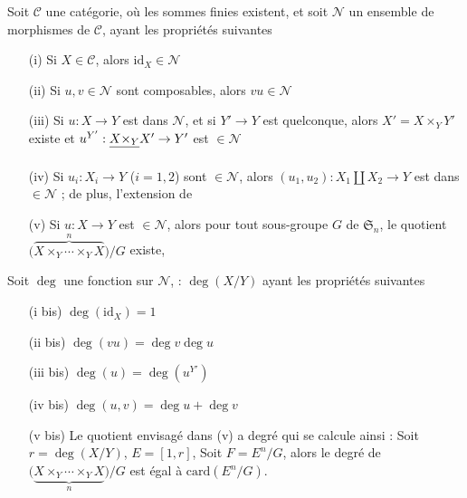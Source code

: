 \documentclass[11pt,a4paper]{article}
\begin{document}
Soit $\mathcal{C}$ une catégorie, où les sommes finies existent, et
soit $\mathcal{N}$ un ensemble de \struck{\ill{}} morphismes de
$\mathcal{C}$, ayant les propriétés suivantes
\begin{enumerate}
  \item[(i)] Si $X \in \mathcal{C}$, alors $\mathrm{id}_X \in \mathcal{N}$
  \item[(ii)] Si $u, v \in \mathcal{N}$ sont composables, alors $vu \in \mathcal{N}$
  \item[(iii)] Si $u : X \to Y$ est dans $\mathcal{N}$, et si $Y' \to Y$ est
  quelconque, alors $X' = X \times_Y Y'$ existe et
  $u^{Y'} : \struck{X \times_Y} X' \to Y'$ est $\in \mathcal{N}$
  \item[(iv)] Si $u_i : X_i \to Y$ ($i = 1, 2$) sont $\in \mathcal{N}$, alors
  $(u_1, u_2) : X_1 \amalg X_2 \to Y$ est dans $\in \mathcal{N}$ ; de plus,
  l'extension de \ill{}
  \item[(v)] Si $u : X \to Y$ est $\in \mathcal{N}$, alors pour tout
  sous-groupe $G$ de $\mathfrak{S}_n$, le quotient
  $\bigl(\overbrace{X \times_Y \cdots \times_Y X}^{n}\bigr)/G$ existe,

   \ill{}
\end{enumerate}

Soit $\deg$ une fonction sur $\mathcal{N}$,  : $\deg(X/Y)$
ayant les propriétés suivantes
\begin{enumerate}
  \item[(i bis)] $\deg(\mathrm{id}_X) = 1$
  \item[(ii bis)] $\deg(vu) = \deg v \deg u$
  \item[(iii bis)] $\deg(u) = \deg(u^{Y'})$
  \item[(iv bis)] $\deg(u, v) = \deg u + \deg v$
  \item[(v bis)] Le quotient envisagé dans (v) a \ill{} degré qui se
  calcule ainsi : Soit 
  $r = \deg(X/Y)$, \ill{} $E = [1, r]$,
  Soit $F = E^n/G$, alors  le degré de
  $\bigl(\underbrace{X \times_Y \cdots \times_Y X}_{n}\bigr)/G$ est égal à
  $\mathrm{card}(E^n/G)$.
\end{enumerate}
\end{document}
